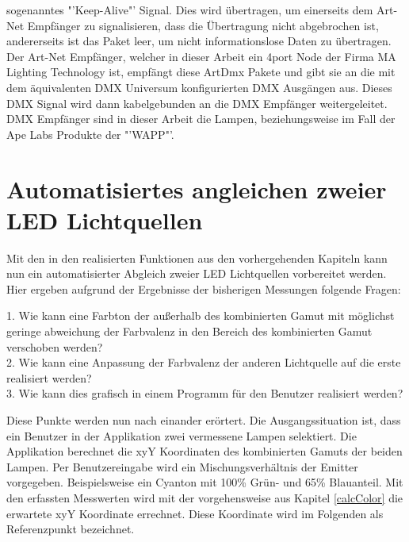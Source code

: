 \documentclass[11pt]{scrartcl}
\begin{document}
sogenanntes "'Keep-Alive"' Signal. Dies wird übertragen, um einerseits dem Art-Net Empfänger zu signalisieren, dass die Übertragung nicht abgebrochen ist,
andererseits ist das Paket leer, um nicht informationslose Daten zu übertragen.\\
Der Art-Net Empfänger, welcher in dieser Arbeit ein 4port Node der Firma MA Lighting Technology ist, empfängt diese ArtDmx Pakete und gibt sie an die mit dem äquivalenten
DMX Universum konfigurierten DMX Ausgängen aus. Dieses DMX Signal wird dann kabelgebunden an die DMX Empfänger weitergeleitet.\\
DMX Empfänger sind in dieser Arbeit die Lampen, beziehungsweise im Fall der Ape Labs Produkte der "'WAPP"'.
\clearpage

\section{Automatisiertes angleichen zweier LED Lichtquellen}
Mit den in den realisierten Funktionen aus den vorhergehenden Kapiteln kann nun ein automatisierter Abgleich zweier LED Lichtquellen vorbereitet werden. Hier
ergeben aufgrund der Ergebnisse der bisherigen Messungen folgende Fragen:\\
\begin{addmargin}[2em]{0em}
    1. Wie kann eine Farbton der außerhalb des kombinierten Gamut mit möglichst geringe abweichung der Farbvalenz in den Bereich des kombinierten Gamut
    verschoben werden?\\
    2. Wie kann eine Anpassung der Farbvalenz der anderen Lichtquelle auf die erste realisiert werden?\\
    3. Wie kann dies grafisch in einem Programm für den Benutzer realisiert werden?\\
\end{addmargin}
Diese Punkte werden nun nach einander erörtert. Die Ausgangssituation ist, dass ein Benutzer in der Applikation zwei vermessene Lampen selektiert. Die
Applikation berechnet die xyY Koordinaten des kombinierten Gamuts der beiden Lampen.
Per Benutzereingabe wird ein Mischungsverhältnis der Emitter vorgegeben. Beispielsweise ein Cyanton mit 100\% Grün- und 65\% Blauanteil. Mit den erfassten
Messwerten wird mit der vorgehensweise aus Kapitel \ref{calcColor} die erwartete xyY Koordinate errechnet. Diese Koordinate wird im Folgenden als
Referenzpunkt bezeichnet.
\end{document}
